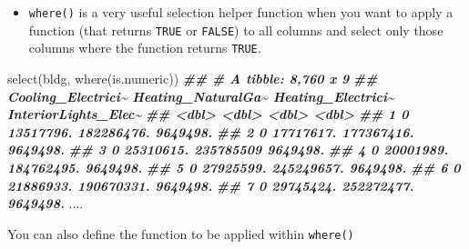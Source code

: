 \documentclass[
]{book}
\newenvironment{Shaded}{\begin{snugshade}}{\end{snugshade}}
\newcommand{\DocumentationTok}[1]{\textcolor[rgb]{0.56,0.35,0.01}{\textbf{\textit{#1}}}}
\newcommand{\FunctionTok}[1]{\textcolor[rgb]{0.00,0.00,0.00}{#1}}
\newcommand{\NormalTok}[1]{#1}
\providecommand{\tightlist}{%
  \setlength{\itemsep}{0pt}\setlength{\parskip}{0pt}}
\begin{document}
\begin{itemize}
\tightlist
\item
  \texttt{where()} is a very useful selection helper function when you want to apply a function (that returns \texttt{TRUE} or \texttt{FALSE}) to all columns and select only those columns where the function returns \texttt{TRUE}.
\end{itemize}

\begin{Shaded}
\begin{Highlighting}[]
\FunctionTok{select}\NormalTok{(bldg, }\FunctionTok{where}\NormalTok{(is.numeric))}
\DocumentationTok{\#\# \# A tibble: 8,760 x 9}
\DocumentationTok{\#\#    Cooling\_Electrici\textasciitilde{} Heating\_NaturalGa\textasciitilde{} Heating\_Electrici\textasciitilde{} InteriorLights\_Elec\textasciitilde{}}
\DocumentationTok{\#\#                 \textless{}dbl\textgreater{}              \textless{}dbl\textgreater{}              \textless{}dbl\textgreater{}                \textless{}dbl\textgreater{}}
\DocumentationTok{\#\#  1                  0          13517796.         182286476.             9649498.}
\DocumentationTok{\#\#  2                  0          17717617.         177367416.             9649498.}
\DocumentationTok{\#\#  3                  0          25310615.         235785509              9649498.}
\DocumentationTok{\#\#  4                  0          20001989.         184762495.             9649498.}
\DocumentationTok{\#\#  5                  0          27925599.         245249657.             9649498.}
\DocumentationTok{\#\#  6                  0          21886933.         190670331.             9649498.}
\DocumentationTok{\#\#  7                  0          29745424.         252272477.             9649498.}
\NormalTok{....}
\end{Highlighting}
\end{Shaded}

You can also define the function to be applied within \texttt{where()}
\end{document}
